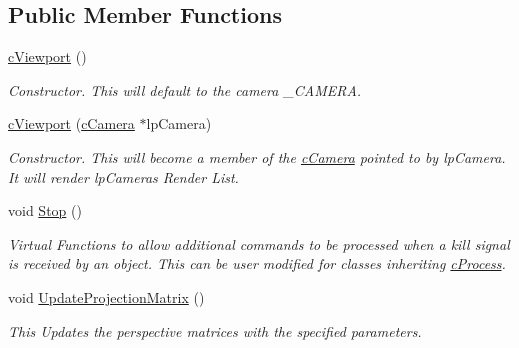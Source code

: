 \subsection*{Public Member Functions}
\begin{DoxyCompactItemize}
\item 
\hypertarget{classc_viewport_a8c50862df319df36f0ee37aa3fb6c6a4}{
\hyperlink{classc_viewport_a8c50862df319df36f0ee37aa3fb6c6a4}{cViewport} ()}
\label{classc_viewport_a8c50862df319df36f0ee37aa3fb6c6a4}

\begin{DoxyCompactList}\small\item\em Constructor. This will default to the camera \_\-CAMERA. \end{DoxyCompactList}\item 
\hypertarget{classc_viewport_a3b61b54eb6c94467af5fb6fbbc5e6df5}{
\hyperlink{classc_viewport_a3b61b54eb6c94467af5fb6fbbc5e6df5}{cViewport} (\hyperlink{classc_camera}{cCamera} $\ast$lpCamera)}
\label{classc_viewport_a3b61b54eb6c94467af5fb6fbbc5e6df5}

\begin{DoxyCompactList}\small\item\em Constructor. This will become a member of the \hyperlink{classc_camera}{cCamera} pointed to by lpCamera. It will render lpCameras Render List. \end{DoxyCompactList}\item 
\hypertarget{classc_viewport_ae526efd0262c21a57ff81a6918edb800}{
void \hyperlink{classc_viewport_ae526efd0262c21a57ff81a6918edb800}{Stop} ()}
\label{classc_viewport_ae526efd0262c21a57ff81a6918edb800}

\begin{DoxyCompactList}\small\item\em Virtual Functions to allow additional commands to be processed when a kill signal is received by an object. This can be user modified for classes inheriting \hyperlink{classc_process}{cProcess}. \end{DoxyCompactList}\item 
\hypertarget{classc_viewport_a08fe52f550cbf1fc47d77b24bc544312}{
void \hyperlink{classc_viewport_a08fe52f550cbf1fc47d77b24bc544312}{UpdateProjectionMatrix} ()}
\label{classc_viewport_a08fe52f550cbf1fc47d77b24bc544312}

\begin{DoxyCompactList}\small\item\em This Updates the perspective matrices with the specified parameters. \end{DoxyCompactList}\end{DoxyCompactItemize}


